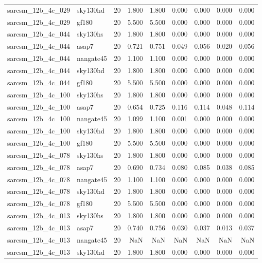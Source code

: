 \begin{tabular}{llrrrrrrr}
sarcsm\_12b\_4c\_029 & sky130hd & 20 & 1.800 & 1.800 & 0.000 & 0.000 & 0.000 & 0.000 \\
sarcsm\_12b\_4c\_029 & gf180 & 20 & 5.500 & 5.500 & 0.000 & 0.000 & 0.000 & 0.000 \\
sarcsm\_12b\_4c\_044 & sky130hs & 20 & 1.800 & 1.800 & 0.000 & 0.000 & 0.000 & 0.000 \\
sarcsm\_12b\_4c\_044 & asap7 & 20 & 0.721 & 0.751 & 0.049 & 0.056 & 0.020 & 0.056 \\
sarcsm\_12b\_4c\_044 & nangate45 & 20 & 1.100 & 1.100 & 0.000 & 0.000 & 0.000 & 0.000 \\
sarcsm\_12b\_4c\_044 & sky130hd & 20 & 1.800 & 1.800 & 0.000 & 0.000 & 0.000 & 0.000 \\
sarcsm\_12b\_4c\_044 & gf180 & 20 & 5.500 & 5.500 & 0.000 & 0.000 & 0.000 & 0.000 \\
sarcsm\_12b\_4c\_100 & sky130hs & 20 & 1.800 & 1.800 & 0.000 & 0.000 & 0.000 & 0.000 \\
sarcsm\_12b\_4c\_100 & asap7 & 20 & 0.654 & 0.725 & 0.116 & 0.114 & 0.048 & 0.114 \\
sarcsm\_12b\_4c\_100 & nangate45 & 20 & 1.099 & 1.100 & 0.001 & 0.000 & 0.000 & 0.000 \\
sarcsm\_12b\_4c\_100 & sky130hd & 20 & 1.800 & 1.800 & 0.000 & 0.000 & 0.000 & 0.000 \\
sarcsm\_12b\_4c\_100 & gf180 & 20 & 5.500 & 5.500 & 0.000 & 0.000 & 0.000 & 0.000 \\
sarcsm\_12b\_4c\_078 & sky130hs & 20 & 1.800 & 1.800 & 0.000 & 0.000 & 0.000 & 0.000 \\
sarcsm\_12b\_4c\_078 & asap7 & 20 & 0.690 & 0.734 & 0.080 & 0.085 & 0.038 & 0.085 \\
sarcsm\_12b\_4c\_078 & nangate45 & 20 & 1.100 & 1.100 & 0.000 & 0.000 & 0.000 & 0.000 \\
sarcsm\_12b\_4c\_078 & sky130hd & 20 & 1.800 & 1.800 & 0.000 & 0.000 & 0.000 & 0.000 \\
sarcsm\_12b\_4c\_078 & gf180 & 20 & 5.500 & 5.500 & 0.000 & 0.000 & 0.000 & 0.000 \\
sarcsm\_12b\_4c\_013 & sky130hs & 20 & 1.800 & 1.800 & 0.000 & 0.000 & 0.000 & 0.000 \\
sarcsm\_12b\_4c\_013 & asap7 & 20 & 0.740 & 0.756 & 0.030 & 0.037 & 0.013 & 0.037 \\
sarcsm\_12b\_4c\_013 & nangate45 & 20 & NaN & NaN & NaN & NaN & NaN & NaN \\
sarcsm\_12b\_4c\_013 & sky130hd & 20 & 1.800 & 1.800 & 0.000 & 0.000 & 0.000 & 0.000 \\

\end{tabular}
